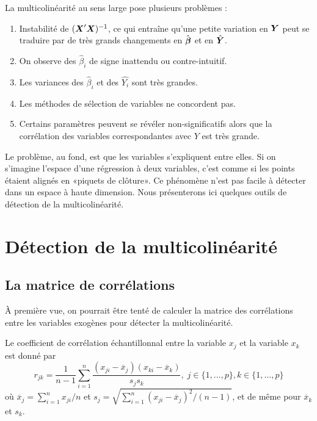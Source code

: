 La multicolinéarité au sens large pose plusieurs problèmes :
\begin{enumerate}
  \item Instabilité de $(\mbox{\boldmath$X$\unboldmath}'\mbox{\boldmath$X$\unboldmath})^{-1}$, ce qui entraîne qu'une petite variation en $\mbox{\boldmath$Y$\unboldmath}$ peut se traduire par de très grands changements en $\hat{\mbox{\boldmath$\beta$}}$ et en $\hat{\mbox{\boldmath$Y$\unboldmath}}$.
  \item On observe des $\hat{\beta}_i$ de signe inattendu ou contre-intuitif.
  \item Les variances des $\hat{\beta}_i$ et des $\hat{Y_i}$ sont très grandes.
  \item Les méthodes de sélection de variables ne concordent pas.
  \item Certains paramètres peuvent se révéler non-significatifs alors que la corrélation des variables correspondantes avec $Y$ est très grande.
\end{enumerate}

Le problème, au fond, est que les variables s'expliquent entre elles. Si on s'imagine l'espace d'une régression à deux variables, c'est comme si les points étaient alignés en «piquets de clôture». Ce phénomène n'est pas facile à détecter dans un espace à haute dimension. Nous présenterons ici quelques outils de détection de la multicolinéarité.

\section{Détection de la multicolinéarité}
\subsection{La matrice de corrélations}
À première vue, on pourrait être tenté de calculer la matrice des corrélations entre les variables exogènes pour détecter la multicolinéarité.

Le coefficient de corrélation échantillonnal entre la variable $x_j$ et la variable $x_k$ est donné par
$$r_{jk}=\dfrac{1}{n-1}\sum_{i=1}^n\frac{(x_{ji}-\overline x_j)(x_{ki}-\overline x_k)}{s_js_k}, \;j\in\{1,\ldots,p\},k\in\{1,\ldots,p\}$$
où $\overline x_j=\sum_{i=1}^n x_{ji}/n$ et $s_j=\sqrt{\sum_{i=1}^n(x_{ji}-\overline x_j)^2/(n-1)}$, et de même pour $\overline x_k$ et $s_k$.

